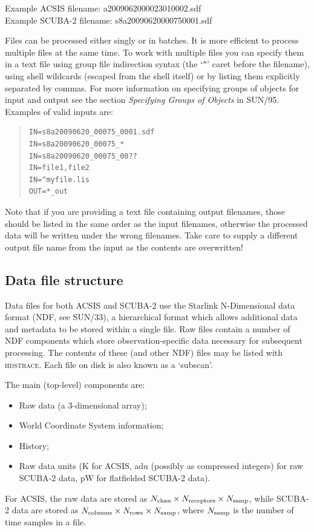 \documentclass[twoside,11pt]{article}
\newcommand{\xref}[3]{#1}
\renewcommand{\_}{\texttt{\symbol{95}}}
\newenvironment{myquote}{\begin{quote}\begin{small}}{\end{small}\end{quote}}
\newcommand{\HDSTRACE}{\textsc{hdstrace}}
\newcommand{\HDSTRACEref}{\xref{\HDSTRACE}{sun102}{}}
\newcommand{\ndfref}{\xref{SUN/33}{sun33}{}}
\begin{document}
Example ACSIS filename: a20090620\_00023\_01\_0002.sdf\\
Example SCUBA-2 filename: s8a20090620\_00075\_0001.sdf

Files can be processed either singly or in batches. It is more
efficient to process multiple files at the same time. To work with
multiple files you can specify them in a text file using group file
indirection syntax (the `\verb+^+' caret before the filename), using shell
wildcards (escaped from the shell itself) or by listing them
explicitly separated by commas. For more information on specifying
groups of objects for input and output see \xref{the section
  \textit{Specifying Groups of Objects} in
  SUN/95}{sun95}{se_groups}. Examples of valid inputs are:
\begin{myquote}
\begin{verbatim}
IN=s8a20090620_00075_0001.sdf
IN=s8a20090620_00075_*
IN=s8a20090620_00075_00??
IN=file1,file2
IN=^myfile.lis
OUT=*_out
\end{verbatim}
\end{myquote}

Note that if you are providing a text file containing output
filenames, those should be listed in the same order as the input
filenames, otherwise the processed data will be written under
the wrong filenames. Take care to supply a different output file name
from the input as the contents are overwritten!

\subsection{Data file structure}

Data files for both ACSIS and SCUBA-2 \cite{sc2ic01} use the Starlink N-Dimensional
data format (NDF, see \ndfref), a hierarchical format which allows
additional data and metadata to be stored within a single file. Raw
files contain a number of NDF components which store
observation-specific data necessary for subsequent processing. The
contents of these (and other NDF) files may be listed with
\HDSTRACEref. Each file on disk is also known as a `subscan'.

The main (top-level) components are:
\begin{itemize}
\item Raw data (a 3-dimensional array);
\item World Coordinate System information;
\item History;
\item Raw data units (K for ACSIS, adu (possibly as compressed integers) for raw SCUBA-2 data,
  pW for flatfielded SCUBA-2 data).
\end{itemize}
For ACSIS, the raw data are stored as $N_{\rm chan} \times N_{\rm
  receptors} \times N_{\rm samp}$, while SCUBA-2 data are stored as
$N_{\rm columns} \times N_{\rm rows} \times N_{\rm samp}$, where
$N_{\rm samp}$ is the number of time samples in a file.
\end{document}
